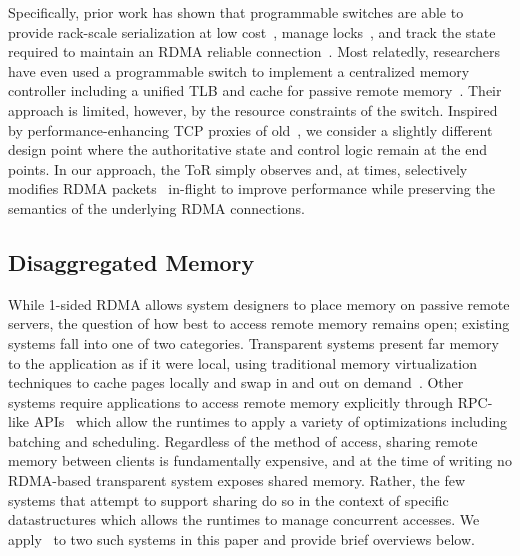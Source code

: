 Specifically, prior work has shown that programmable switches are able
to provide rack-scale serialization at low
cost~\cite{eris,no,when-computer,Grant2021InContRes}, manage
locks~\cite{netlock}, and track the state required to maintain an
RDMA reliable connection~\cite{tea}.  Most relatedly, researchers have
even used a programmable switch to implement a centralized memory
controller including a unified TLB and cache for passive remote
memory~\cite{mind}.  Their approach is limited, however, by the
resource constraints of the switch.  Inspired by performance-enhancing
TCP proxies of old~\cite{snoop,rfc3135}, we consider a slightly
different design point where the authoritative state and control logic
remain at the end points.  In our approach, the ToR simply observes
and, at times, selectively modifies RDMA
packets~\cite{switchml,Grant2021InContRes} in-flight to improve
performance while preserving the semantics of the underlying RDMA
connections.




\subsection{Disaggregated Memory}

While 1-sided RDMA allows system designers to place memory on passive
remote servers, the question of how best to access remote memory
remains open; existing systems fall into one of two categories.
Transparent systems present far memory to the application as if it
were local, using traditional memory virtualization techniques to
cache pages locally and swap in and out on
demand~\cite{ivy,infiniswap, leap, fastswap,legoos}.
Other systems require applications to access remote memory explicitly
through RPC-like APIs~\cite{aifm,reigons,clover,sherman,fasst} which
allow the runtimes to apply a variety of optimizations including
batching and scheduling.
Regardless of the method of access, sharing remote memory between
clients is fundamentally expensive, and at the time of writing no
RDMA-based transparent system exposes shared memory.  Rather, the few systems
that attempt to support sharing do so in the context of
specific datastructures which allows the runtimes to manage concurrent
accesses.  We apply \sword\ to two such systems in this paper and
provide brief overviews below.

